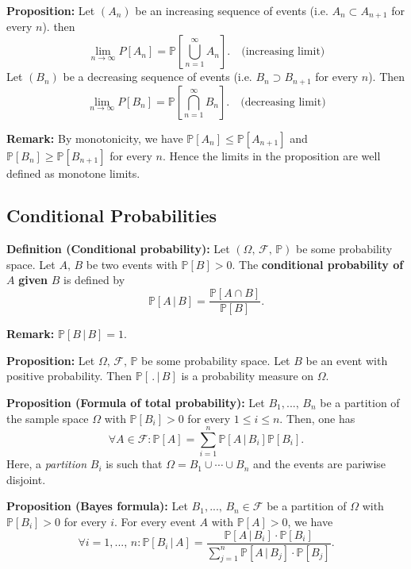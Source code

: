 \documentclass[a4paper]{extarticle}
\begin{document}
\begin{tbox}
    \textbf{Proposition:} Let \((A_n)\) be an increasing sequence of events (i.e. \(A_n \subset A_{n + 1}\) for every \(n\)). then
    \[
        \lim_{n \to \infty} P[A_n] = \mathbb{P}[\bigcup_{n = 1}^{\infty}A_n]. \quad \text{(increasing limit)}
    \]
    Let \((B_n)\) be a decreasing sequence of events (i.e. \(B_n \supset B_{n + 1}\) for every \(n\)). Then
    \[
        \lim_{n \to \infty} P[B_n] = \mathbb{P}[\bigcap_{n = 1}^{\infty} B_n]. \quad \text{(decreasing limit)}
    \]
\end{tbox}

\textbf{Remark:} By monotonicity, we have \(\mathbb{P}[A_n] \leq \mathbb{P}[A_{n + 1}]\) and \(\mathbb{P}[B_n] \geq \mathbb{P}[B_{n + 1}]\) for every \(n\). Hence the limits in the proposition are well defined as monotone limits.

\subsection{Conditional Probabilities}

\textbf{Definition (Conditional probability):} Let \((\Omega, \, \mathcal{F}, \, \mathbb{P})\) be some probability space. Let \(A, \, B\) be two events with \(\mathbb{P}[B] > 0\). The \textbf{conditional probability of} \(A\) \textbf{given} \(B\) is defined by
\[
    \mathbb{P}[A \, | \, B] = \frac{\mathbb{P}[A \cap B]}{\mathbb{P}[B]}.
\]

\textbf{Remark:} \(\mathbb{P}[B \, | \, B] = 1\).

\textbf{Proposition:} Let \(\Omega, \, \mathcal{F}, \, \mathbb{P}\) be some probability space. Let \(B\) be an event with positive probability. Then \(\mathbb{P}[ \,. \, | \, B]\) is a probability measure on \(\Omega\).

\begin{tbox}
    \textbf{Proposition (Formula of total probability):} Let \(B_1,..., \, B_n\) be a partition of the sample space \(\Omega\) with \(\mathbb{P}[B_i] > 0\) for every \(1 \leq i \leq n\). Then, one has
    \[
        \forall A \in \mathcal{F} : \mathbb{P}[A] = \sum_{i = 1}^n \mathbb{P}[A \, | \, B_i] \mathbb{P}[B_i].
    \]
    Here, a \textit{partition} \(B_i\) is such that \(\Omega = B_1 \cup \cdots \cup B_n\) and the events are pariwise disjoint.
\end{tbox}

\begin{tbox}
    \textbf{Proposition (Bayes formula):} Let \(B_1,..., \, B_n \in \mathcal{F}\) be a partition of \(\Omega\) with \(\mathbb{P}[B_i] > 0\) for every \(i\). For every event \(A\) with \(\mathbb{P}[A] > 0\), we have
    \[
        \forall i = 1,..., \, n : \mathbb{P}[B_i \, | \, A] = \frac{\mathbb{P}[A \, | \, B_i] \cdot \mathbb{P}[B_i]}{\sum_{j = 1}^n \mathbb{P}[A \, | \, B_j] \cdot \mathbb{P}[B_j]}.
    \]
\end{tbox}
\end{document}

